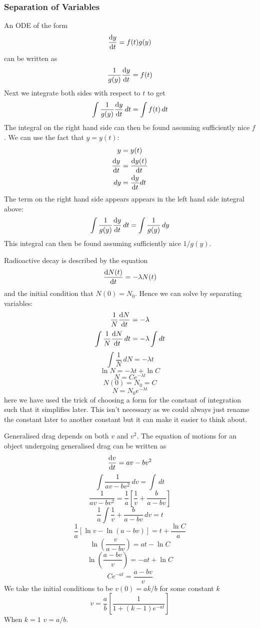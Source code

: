 \documentclass{article}
\begin{document}
    \subsubsection{Separation of Variables}
    An ODE of the form
    \[\dv{y}{t} = f(t)g(y)\]
    can be written as
    \[\frac{1}{g(y)}\dv{y}{t} = f(t)\]
    Next we integrate both sides with respect to \(t\) to get
    \[\int \frac{1}{g(y)}\dv{y}{t}\,dt = \int f(t)\,dt\]
    The integral on the right hand side can then be found assuming sufficiently nice \(f\).
    We can use the fact that \(y = y(t)\):
    \begin{align*}
        y &= y(t)\\
        \dv{y}{t} &= \dv{y(t)}{t}\\
        dy &= \dv{y}{t}dt\\
    \end{align*}
    The term on the right hand side appears appears in the left hand side integral above:
    \[\int \frac{1}{g(y)}\dv{y}{t}\,dt = \int \frac{1}{g(y)}\,dy\]
    This integral can then be found assuming sufficiently nice \(1/g(y)\).
    
    \example
    Radioactive decay is described by the equation
    \[\dv{N(t)}{t} = -\lambda N(t)\]
    and the initial condition that \(N(0) = N_0\).
    Hence we can solve by separating variables:
    \[\frac{1}{N}\dv{N}{t} = -\lambda\]
    \[\int\frac{1}{N}\dv{N}{t}\,dt = -\lambda\int dt\]
    \[\int\frac{1}{N}\,dN = -\lambda t\]
    \[\ln N = -\lambda t + \ln C\]
    \[N = Ce^{-\lambda t}\]
    \[N(0) = N_0 = C\]
    \[N = N_0e^{-\lambda t}\]
    here we have used the trick of choosing a form for the constant of integration such that it simplifies later.
    This isn't necessary as we could always just rename the constant later to another constant but it can make it easier to think about.
    
    \example
    Generalised drag depends on both \(v\) and \(v^2\).
    The equation of motions for an object undergoing generalised drag can be written as
    \[\dv{v}{t} = av - bv^2\]
    \[\int\frac{1}{av - bv^2}\,dv = \int\, dt\]
    \[\frac{1}{av - bv^2} = \frac{1}{a}\left[\frac{1}{v} + \frac{b}{a - bv}\right]\]
    \[\frac{1}{a}\int\frac{1}{v} + \frac{b}{a - bv}\,dv = t\]
    \[\frac{1}{a}[\ln v - \ln(a - bv)] = t + \frac{\ln C}{a}\]
    \[\ln\left(\frac{v}{a - bv}\right) = at - \ln C\]
    \[\ln\left(\frac{a - bv}{v}\right) = - at + \ln C\]
    \[Ce^{-at} = \frac{a - bv}{v}\]
    We take the initial conditions to be \(v(0) = ak/b\) for some constant \(k\)
    \[v = \frac{a}{b}\left[\frac{1}{1 + (k - 1)e^{-at}}\right]\]
    When \(k = 1\) \(v = a/b\).
    
\end{document}
